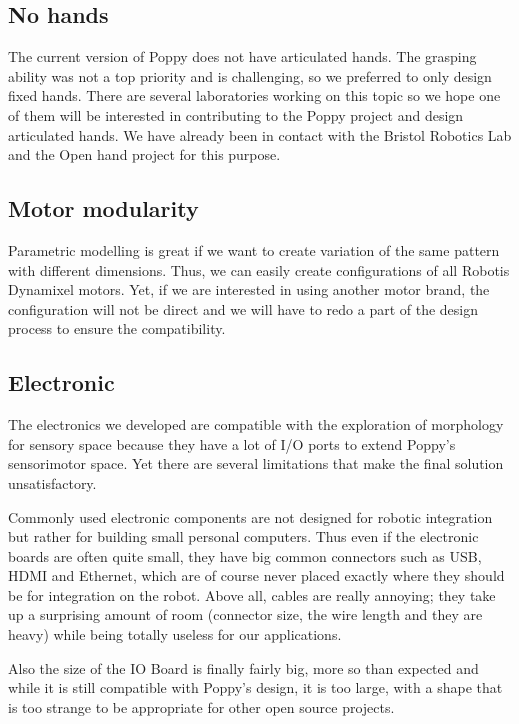 \subsection{No hands} %
The current version of Poppy does not have articulated hands. The grasping ability was not a top priority and is challenging, so we preferred to only design fixed hands. There are several laboratories working on this topic so we hope one of them will be interested in contributing to the Poppy project and design articulated hands. We have already been in contact with the Bristol Robotics Lab and the Open hand project for this purpose.

\subsection{Motor modularity} %
Parametric modelling is great if we want to create variation of the same pattern with different dimensions. Thus, we can easily create configurations of all Robotis Dynamixel motors. Yet, if we are interested in using another motor brand, the configuration will not be direct and we will have to redo a part of the design process to ensure the compatibility.


\subsection{Electronic} %
\label{sub:electronic-limitations}

The electronics we developed are compatible with the exploration of morphology for sensory space because they have a lot of I/O ports to extend Poppy's sensorimotor space. Yet there are several limitations that make the final solution unsatisfactory.

Commonly used electronic components are not designed for robotic integration but rather for building small personal computers. Thus even if the electronic boards are often quite small, they have big common connectors such as USB, HDMI and Ethernet, which are of course never placed exactly where they should be for integration on the robot.
Above all, cables are really annoying; they take up a surprising amount of room (connector size, the wire length and they are heavy) while being totally useless for our applications.

Also the size of the IO Board is finally fairly big, more so than expected and while it is still compatible with Poppy’s design, it is too large, with a shape that is too strange to be appropriate for other open source projects.

